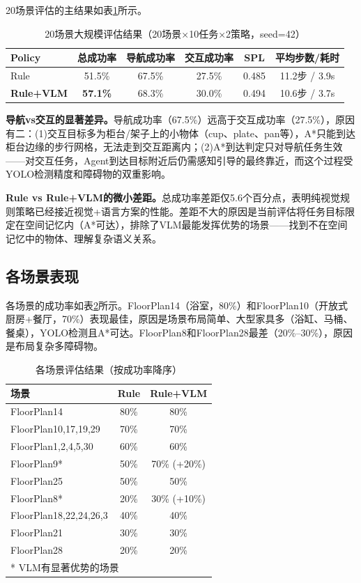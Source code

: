 \documentclass{SYSUReport}
\begin{document}
20场景评估的主结果如表\ref{tab:main_results}所示。

\begin{table}[!ht]
  \centering
  \caption{20场景大规模评估结果（20场景×10任务×2策略，seed=42）}
  \label{tab:main_results}
  \begin{tabular}{lccccc}
    \toprule
    Policy & 总成功率 & 导航成功率 & 交互成功率 & SPL & 平均步数/耗时 \\
    \midrule
    Rule & 51.5\% & 67.5\% & 27.5\% & 0.485 & 11.2步 / 3.9s \\
    \textbf{Rule+VLM} & \textbf{57.1\%} & 68.3\% & 30.0\% & 0.494 & 10.6步 / 3.7s \\
    \bottomrule
  \end{tabular}
\end{table}

\textbf{导航vs交互的显著差异。}导航成功率（67.5\%）远高于交互成功率（27.5\%），原因有二：(1)交互目标多为柜台/架子上的小物体（cup、plate、pan等），A*只能到达柜台边缘的步行网格，无法走到交互距离内；(2)A*到达判定只对导航任务生效——对交互任务，Agent到达目标附近后仍需感知引导的最终靠近，而这个过程受YOLO检测精度和障碍物的双重影响。

\textbf{Rule vs Rule+VLM的微小差距。}总成功率差距仅5.6个百分点，表明纯视觉规则策略已经接近视觉+语言方案的性能。差距不大的原因是当前评估将任务目标限定在空间记忆内（A*可达），排除了VLM最能发挥优势的场景——找到不在空间记忆中的物体、理解复杂语义关系。

\subsection{各场景表现}

各场景的成功率如表\ref{tab:per_scene}所示。FloorPlan14（浴室，80\%）和FloorPlan10（开放式厨房+餐厅，70\%）表现最佳，原因是场景布局简单、大型家具多（浴缸、马桶、餐桌），YOLO检测且A*可达。FloorPlan8和FloorPlan28最差（20\%--30\%），原因是布局复杂多障碍物。

\begin{table}[!ht]
  \centering
  \caption{各场景评估结果（按成功率降序）}
  \label{tab:per_scene}
  \begin{tabular}{lcc}
    \toprule
    场景 & Rule & Rule+VLM \\
    \midrule
    FloorPlan14 & 80\% & 80\% \\
    FloorPlan10,17,19,29 & 70\% & 70\% \\
    FloorPlan1,2,4,5,30 & 60\% & 60\% \\
    FloorPlan9* & 50\% & 70\% (+20\%) \\
    FloorPlan25 & 50\% & 50\% \\
    FloorPlan8* & 20\% & 30\% (+10\%) \\
    FloorPlan18,22,24,26,3 & 40\% & 40\% \\
    FloorPlan21 & 30\% & 30\% \\
    FloorPlan28 & 20\% & 20\% \\
    \bottomrule
    \multicolumn{3}{l}{* VLM有显著优势的场景} \\
  \end{tabular}
\end{table}
\end{document}
